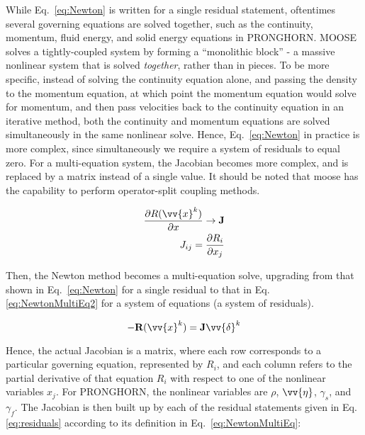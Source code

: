 \documentclass[10pt]{article}
\numberwithin{equation}{section} %
\begin{document}
While Eq.~\eqref{eq:Newton} is written for a single residual statement, oftentimes several governing equations are solved together, such as the continuity, momentum, fluid energy, and solid energy equations in PRONGHORN. MOOSE solves a tightly-coupled system by forming a ``monolithic block'' - a massive nonlinear system that is solved \textit{together}, rather than in pieces. To be more specific, instead of solving the continuity equation alone, and passing the density to the momentum equation, at which point the momentum equation would solve for momentum, and then pass velocities back to the continuity equation in an iterative method, both the continuity and momentum equations are solved simultaneously in the same nonlinear solve. Hence, Eq.~\eqref{eq:Newton} in practice is more complex, since simultaneously we require a system of residuals to equal zero. For a multi-equation system, the Jacobian becomes more complex, and is replaced by a matrix instead of a single value. It should be noted that \gls{moose} has the capability to perform operator-split coupling methods.

\begin{equation}
\label{eq:NewtonMultiEq}
\begin{aligned}
\frac{\partial R(\vv{x}^k)}{\partial x}\rightarrow\textbf{J}\\
J_{ij}=\frac{\partial R_i}{\partial x_j}\\
\end{aligned}
\end{equation}

Then, the Newton method becomes a multi-equation solve, upgrading from that shown in Eq.~\eqref{eq:Newton} for a single residual to that in Eq. \eqref{eq:NewtonMultiEq2} for a system of equations (a system of residuals). 

\begin{equation}
\label{eq:NewtonMultiEq2}
-\textbf{R}(\vv{x}^k)=\textbf{J}\vv{\delta}^k
\end{equation}

Hence, the actual Jacobian is a matrix, where each row corresponds to a particular governing equation, represented by \(R_i\), and each column refers to the partial derivative of that equation \(R_i\) with respect to one of the nonlinear variables \(x_j\). For PRONGHORN, the nonlinear variables are \(\rho\), \(\vv{\eta}\), \(\gamma_s\), and \(\gamma_f\). The Jacobian is then built up by each of the residual statements given in Eq. \eqref{eq:residuals} according to its definition in Eq.~\eqref{eq:NewtonMultiEq}:
\end{document}

